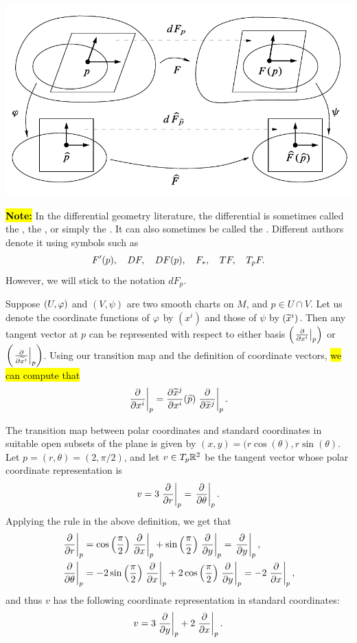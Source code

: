 \begin{center}
\includegraphics[scale = 0.5]{chapter03/c3f6.png}
\end{center}

\hl{\textbf{Note:}} In the differential geometry literature, the differential is sometimes called the , the , or simply the . It can also sometimes be called the . Different authors denote it using symbols such as
\[F^\prime(p),\quad DF,\quad DF(p),\quad F_*,\quad TF, \quad T_pF.\]
However, we will stick to the notation $dF_p$.

\dfn Suppose $(U,\varphi)$ and $(V,\psi)$ are two smooth charts on $M$, and $p\in U\cap V$. Let us denote the coordinate functions of $\varphi$ by $(x^i)$ and those of $\psi$ by $(\widetilde x^i)$. Then any tangent vector at $p$ can be represented with respect to either basis $\left(\left. \frac{\partial}{\partial x^i}\right|_{p}\right)$ or $\left(\left. \frac{\partial}{\partial \widetilde x^i}\right|_{p}\right)$. Using our transition map and the definition of coordinate vectors, \hl{we can compute that}
\[\left. \frac{\partial}{\partial x^i}\right|_{p} = \frac{\partial{\widetilde x^j}}{\partial{x^i}}(\widehat p)\left. \frac{\partial}{\partial \widetilde x^j}\right|_{p}.\]

\begin{ex}
The transition map between polar coordinates and standard coordinates in suitable open subsets of the plane is given by $(x,y) = (r\cos(\theta),r\sin(\theta)$. Let $p = (r,\theta) = (2, \pi/2)$, and let $v\in T_p\mathbb{R}^2$ be the tangent vector whose polar coordinate representation is
\[v = 3\left. \frac{\partial}{\partial r}\right|_{p} = \left. \frac{\partial}{\partial \theta}\right|_{p}.\]
Applying the rule in the above definition, we get that
\begin{align*}
    \left. \frac{\partial}{\partial r}\right|_{p} &= \cos\left(\frac{\pi}{2}\right)\left. \frac{\partial}{\partial x}\right|_{p} + \sin\left(\frac{\pi}{2}\right)\left. \frac{\partial}{\partial y}\right|_{p} = \left. \frac{\partial}{\partial y}\right|_{p},\\
    \left. \frac{\partial}{\partial \theta}\right|_{p} &= 
    -2\sin\left(\frac{\pi}{2}\right)\left. \frac{\partial}{\partial x}\right|_{p} + 2\cos\left(\frac{\pi}{2}\right)\left. \frac{\partial}{\partial y}\right|_{p} = -2\left. \frac{\partial}{\partial x}\right|_{p},
\end{align*}
and thus $v$ has the following coordinate representation in standard coordinates:
\[v = 3\left. \frac{\partial}{\partial y}\right|_{p} + 2\left. \frac{\partial}{\partial x}\right|_{p}.\]
\end{ex}


